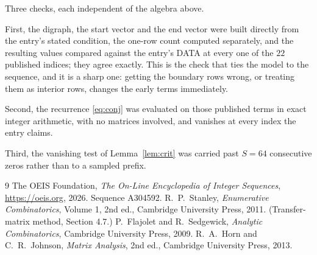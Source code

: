 \documentclass[11pt,a4paper]{article}
\theoremstyle{plain}
\theoremstyle{definition}
\begin{document}
Three checks, each independent of the algebra above.

First, the digraph, the start vector and the end vector were built directly from the
entry's stated condition, the one-row count computed separately, and the resulting values
compared against the entry's DATA at every one of the $22$ published indices; they
agree exactly. This is the check that ties the model to the sequence, and it is a sharp one:
getting the boundary rows wrong, or treating them as interior rows, changes the early terms
immediately.

Second, the recurrence \eqref{eq:conj} was evaluated on those published terms in exact
integer arithmetic, with no matrices involved, and vanishes at every index the entry claims.

Third, the vanishing test of Lemma~\ref{lem:crit} was carried past $S=64$ consecutive
zeros rather than to a sampled prefix.

\begin{thebibliography}{9}
 The OEIS Foundation, \emph{The On-Line Encyclopedia of Integer
Sequences}, \url{https://oeis.org}, 2026. Sequence A304592.
 R.~P.~Stanley, \emph{Enumerative Combinatorics}, Volume 1, 2nd ed.,
Cambridge University Press, 2011. (Transfer-matrix method, Section 4.7.)
 P.~Flajolet and R.~Sedgewick, \emph{Analytic Combinatorics}, Cambridge
University Press, 2009.
 R.~A.~Horn and C.~R.~Johnson, \emph{Matrix Analysis}, 2nd ed., Cambridge
University Press, 2013.
\end{thebibliography}
\end{document}
